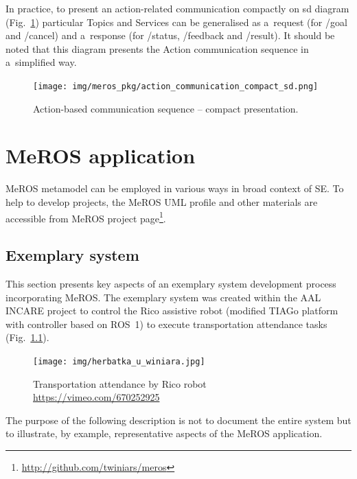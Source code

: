 \documentclass[11pt,oneside,a4paper]{report}
\begin{document}
	In practice, to present an action-related communication compactly on sd diagram (Fig.~\ref{fig:action_communication_compact_sd}) particular Topics and Services can be generalised as a~request (for /goal and /cancel) and a~response (for /status, /feedback and /result). It should be noted that this diagram presents the Action communication sequence in a~simplified way.
	
	\begin{figure}[H]
		\centering
		\begin{center}
			{\texttt{[image: img/meros\_pkg/action\_communication\_compact\_sd.png]}}
		\end{center}
		\caption{Action-based communication sequence -- compact presentation.} 
		\label{fig:action_communication_compact_sd}
	\end{figure}

	
	
\chapter{MeROS application}
\label{ch:application}
	
	
	MeROS metamodel can be employed in various ways in broad context of SE. To help to develop projects, the MeROS UML profile and other materials are accessible from MeROS project page\footnote{\url{http://github.com/twiniars/meros}}. 
	
	
\section{Exemplary system}
\label{ch:application-example}

	This section presents key aspects of an exemplary system development process incorporating MeROS. The exemplary system was created within the AAL INCARE project to control the Rico assistive robot (modified TIAGo platform with controller based on ROS~1) to execute transportation attendance tasks (Fig.~\ref{fig:herbatka_u_winiara}).
	
	\begin{figure}[H]
		\centering
		\begin{center}
			{\texttt{[image: img/herbatka\_u\_winiara.jpg]}}
		\end{center}
		\caption{Transportation attendance by Rico robot \url{https://vimeo.com/670252925}} 
		\label{fig:herbatka_u_winiara}
	\end{figure}
	
	
	
	 The purpose of the following description is not to document the entire system but to illustrate, by example, representative aspects of the MeROS application.
	 
\end{document}
